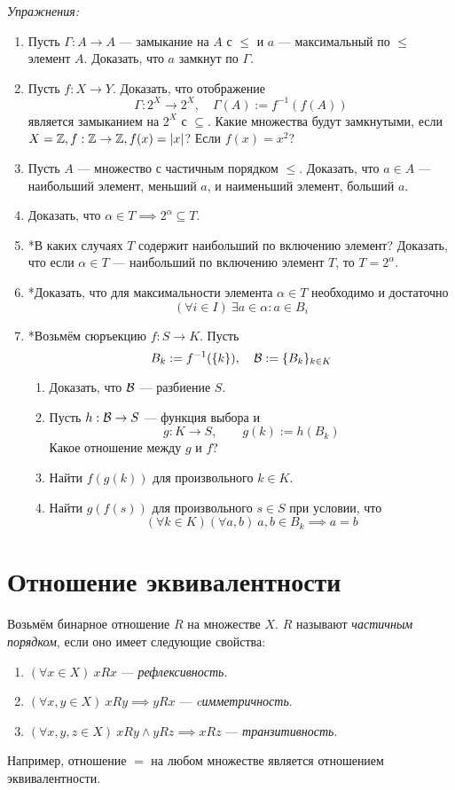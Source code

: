 \vspace{1em}
{\it Упражнения:}
\begin{enumerate}
	\item{}Пусть $\Gamma:A\to A$ --- замыкание на $A$ с $\leq$ и $a$ ---
	максимальный по $\leq$ элемент $A$. Доказать, что $a$ замкнут по $\Gamma$.
	\item{}Пусть $f:X\to Y$. Доказать, что отображение
	\[
		\Gamma:2^{X}\to 2^{X},\quad \Gamma(A):= f^{-1}(f(A))
	\]
	является замыканием на $2^{X}$ с $\subseteq$. Какие множества
	будут замкнутыми, если $X=\mathbb Z,f:\mathbb Z\to \mathbb Z,f(x)=|x|$? Если $f(x)=x^{2}$?
	\item{}Пусть $A$ --- множество с частичным порядком $\leq$.
	Доказать, что $a\in A$ --- наибольший элемент, меньший $a$,
	и наименьший элемент, больший $a$.
	\item{}Доказать, что $\alpha\in T\implies 2^{\alpha}\subseteq T$.
	\item{}*В каких случаях $T$ содержит наибольший по включению элемент?
	Доказать, что если $\alpha\in T$ --- наибольший по включению элемент $T$,
	то $T=2^{\alpha}$.
	\item{}*Доказать, что для максимальности элемента $\alpha\in T$ необходимо
	и достаточно
	\[
		(\forall i\in I)~\exists a\in\alpha:a\in B_{i}
	\]
	\item{}*Возьмём сюръекцию $f:S\to K$. Пусть
	\[
		B_{k}:=f^{-1}(\{k\}),\quad \mathcal B:=\{B_{k}\}_{k\in K}
	\]
	\begin{enumerate}
		\item{}Доказать, что $\mathcal B$ --- разбиение $S$.
		\item{}Пусть $h:\mathcal B\to S$ --- функция выбора и
		\[
			g:K\to S,\qquad g(k):=h(B_{k})
		\]
		Какое отношение между $g$ и $f$?
		\item{}Найти $f(g(k))$ для произвольного $k\in K$.
		\item{}Найти $g(f(s))$ для произвольного $s\in S$ при условии, что
		\[
			(\forall k\in K)(\forall a,b)~a,b\in B_{k}\implies a=b
		\]
	\end{enumerate}
\end{enumerate}

\section{Отношение эквивалентности}

Возьмём бинарное отношение $R$ на множестве $X$. $R$ называют {\it частичным порядком},
если оно имеет следующие свойства:
\begin{enumerate}
	\item{}$(\forall x\in X)~xRx$ --- {\it рефлексивность}.
	\item{}$(\forall x,y\in X)~xRy\implies yRx$ --- {\it cимметричность}.
	\item{}$(\forall x,y,z\in X)~xRy\land yRz\implies xRz$ --- {\it транзитивность}.
\end{enumerate}
Например, отношение $=$ на любом множестве является отношением эквивалентности.

